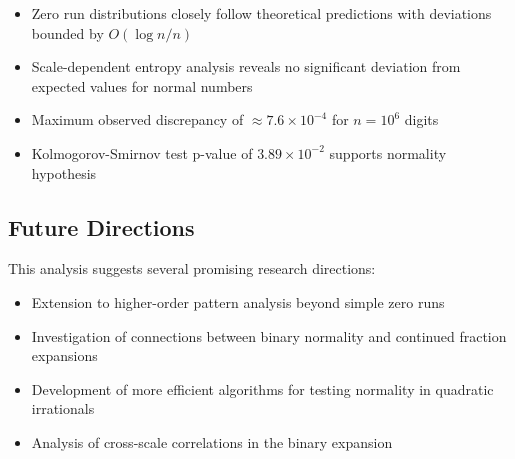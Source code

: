 \begin{itemize}
    \item Zero run distributions closely follow theoretical predictions with deviations bounded by $O(\log n/n)$
    \item Scale-dependent entropy analysis reveals no significant deviation from expected values for normal numbers
    \item Maximum observed discrepancy of $\approx 7.6 \times 10^{-4}$ for $n = 10^6$ digits
    \item Kolmogorov-Smirnov test p-value of $3.89 \times 10^{-2}$ supports normality hypothesis
\end{itemize}

\newpage
\subsection{Future Directions}
This analysis suggests several promising research directions:
\begin{itemize}
    \item Extension to higher-order pattern analysis beyond simple zero runs
    \item Investigation of connections between binary normality and continued fraction expansions
    \item Development of more efficient algorithms for testing normality in quadratic irrationals
    \item Analysis of cross-scale correlations in the binary expansion
\end{itemize}